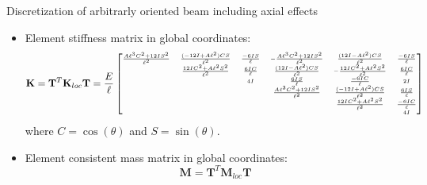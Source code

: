 \documentclass[aspectratio=169]{beamer}
\begin{document}
\begin{frame}{Discretization of arbitrarly oriented beam including axial effects}
  \begin{itemize}
    \item Element stiffness matrix in global coordinates:
          $$\tiny \mathbf{K} = \mathbf T^T \mathbf{K}_{loc} \mathbf T=\frac{E}{\ell}\begin{bmatrix}
              \frac{A \ell^3 C^2 + 12 I S^2}{\ell^2} & \frac{(-12 I + A \ell^2) C S}{\ell^2}  & \frac{-6 I S}{\ell} & -\frac{A \ell^3 C^2 + 12 I S^2}{\ell^2} & \frac{(12 I - A \ell^2) C S}{\ell^2}    & \frac{-6 I S}{\ell} \\
                                                     & \frac{12 I C^2 + A \ell^2 S^2}{\ell^2} & \frac{6 I C}{\ell}  & \frac{(12 I - A \ell^2) C S}{\ell^2}    & -\frac{12 I C^2 + A \ell^2 S^2}{\ell^2} & \frac{6 I C}{\ell}  \\
                                                     &                                        & 4 I                 & \frac{6 I S}{\ell}                      & \frac{-6 I C}{\ell}                     & 2 I                 \\
                                                     &                                        &                     & \frac{A \ell^3 C^2 + 12 I S^2}{\ell^2}  & \frac{(-12 I + A \ell^2) C S}{\ell^2}   & \frac{6 I S}{\ell}  \\
                                                     &                                        &                     &                                         & \frac{12 I C^2 + A \ell^2 S^2}{\ell^2}  & \frac{-6 I C}{\ell} \\
                                                     &                                        &                     &                                         &                                         & 4 I
            \end{bmatrix}$$
          where $C=\cos(\theta)$ and $S=\sin(\theta)$.
          \vspace{0.3cm}
    \item Element consistent mass matrix in global coordinates:
          $$\mathbf{M} = \mathbf T^T \mathbf{M}_{loc} \mathbf T$$
  \end{itemize}
\end{frame}
\end{document}
